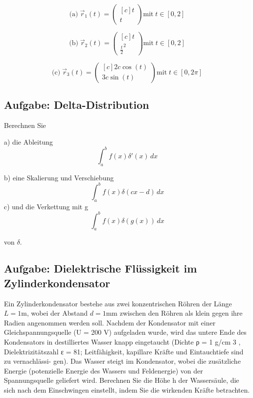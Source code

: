 \begin{equation*}
    \text{(a)}\; \vec{r}_1 (t) = 
\begin{pmatrix*}[c]
t \\
t
\end{pmatrix*}
\text{mit}\; t \in [0, 2]
\end{equation*}

\begin{equation*}
    \text{(b)}\; \vec{r}_2 (t) = 
\begin{pmatrix*}[c]
t \\
\frac{t}{2}^2
\end{pmatrix*}
\text{mit}\; t \in [0, 2]
\end{equation*}

\begin{equation*}
    \text{(c)}\; \vec{r}_3 (t) = 
\begin{pmatrix*}[c]
    2c \cos(t) \\
    3c \sin(t)
\end{pmatrix*}
\text{mit}\; t \in [0, 2\pi]
\end{equation*}

\subsection{Aufgabe: Delta-Distribution}
Berechnen Sie 

a) die Ableitung
\begin{equation*}
    \int_{a}^{b} f(x) \delta'(x)\, dx
\end{equation*}

b) eine Skalierung und Verschiebung
\begin{equation*}
    \int_{a}^{b} f(x) \delta(cx- d)\, dx
\end{equation*}
c) und die Verkettung mit g
\begin{equation*}
    \int_{a}^{b} f(x) \delta(g(x))\, dx
\end{equation*}


von $\delta.$ 

\subsection{Aufgabe: Dielektrische Flüssigkeit im Zylinderkondensator}

Ein Zylinderkondensator bestehe aus zwei konzentrischen Röhren der Länge $L = 1 \si{\meter}$, wobei der
Abstand $d = 1 \si{\milli\meter}$ zwischen den Röhren als klein gegen ihre Radien angenommen werden soll.
Nachdem der Kondensator mit einer Gleichspannungsquelle (U = 200 V) aufgeladen wurde, wird
das untere Ende des Kondensators in destilliertes Wasser knapp eingetaucht (Dichte ρ = 1 g/cm 3 ,
Dielektrizitätszahl ε = 81; Leitfähigkeit, kapillare Kräfte und Eintauchtiefe sind zu vernachlässi-
gen). Das Wasser steigt im Kondensator, wobei die zusätzliche Energie (potenzielle Energie des
Wassers und Feldenergie) von der Spannungsquelle geliefert wird.
Berechnen Sie die Höhe h der Wassersäule, die sich nach dem Einschwingen einstellt, indem Sie die
wirkenden Kräfte betrachten.

